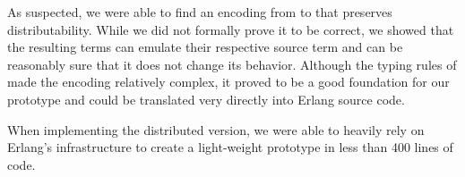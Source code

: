 As suspected, we were able to find an encoding
from \corejoincalc to \actorpicalc
that preserves distributability.
While we did not formally prove it to be correct,
we showed that the resulting terms can emulate their respective source term
and can be reasonably sure that it does not change its behavior.
Although the typing rules of \actorpicalc made the encoding relatively complex,
it proved to be a good foundation for our prototype
and could be translated very directly into Erlang source code.

When implementing the distributed version,
we were able to heavily rely on Erlang's infrastructure
to create a light-weight prototype in less than 400 lines of code.

